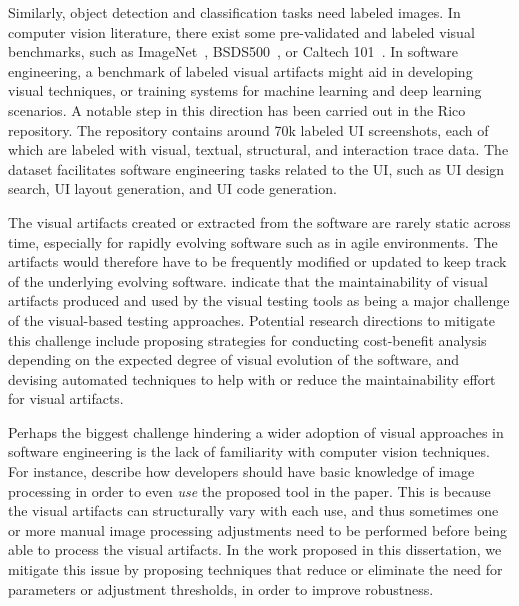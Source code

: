 Similarly, object detection and classification tasks need labeled images.
In computer vision literature, there exist some pre-validated and labeled visual
benchmarks, such as ImageNet~\cite{Russakovsky:2015:ILS:2846547.2846559},
BSDS500~\cite{MartinFTM01}, or Caltech 101~\cite{Fei-Fei:2006:OLO:1115692.1115783}.
In software engineering,
a benchmark of labeled visual artifacts might
aid in developing visual techniques,
or training systems for machine learning and deep learning
scenarios.
A notable step in this direction has been carried out 
in the Rico~\cite{Deka-2017-UIST} repository. 
The repository contains around 70k labeled UI screenshots, 
each of which are labeled with 
visual, textual, structural, and interaction trace data.
The dataset facilitates software engineering tasks 
related to the UI, such as UI design search, UI layout generation, 
and UI code generation.


The visual artifacts created or extracted from the software 
are rarely static across time,
especially for rapidly evolving software such as in agile environments.
The artifacts would therefore have to be frequently modified
or updated to keep track of the underlying evolving software.
\citet{Alegroth-2013-ICST} indicate that
the maintainability of visual artifacts
produced and used by the visual testing tools
as being a major challenge of the
visual-based testing approaches.
Potential research directions to mitigate this challenge 
include proposing strategies for conducting cost-benefit analysis
depending on the expected degree of visual evolution of the software,
and devising automated techniques to
help with or reduce the maintainability
effort for visual artifacts. 


Perhaps the biggest challenge hindering a wider adoption
of visual approaches in software engineering
is the lack of familiarity with computer vision techniques.
For instance,
\citet{Delamaro-2011-STVR} describe how developers
should have basic knowledge of image processing
in order to even \textit{use} the proposed tool in the paper.
This is because the visual artifacts can structurally vary with each use,
and thus sometimes one or more manual image processing adjustments
need to be performed before being able to process the visual artifacts. 
In the work proposed in this dissertation, we mitigate this issue 
by proposing techniques that reduce or eliminate the need for parameters or adjustment thresholds, in order to improve robustness. 

